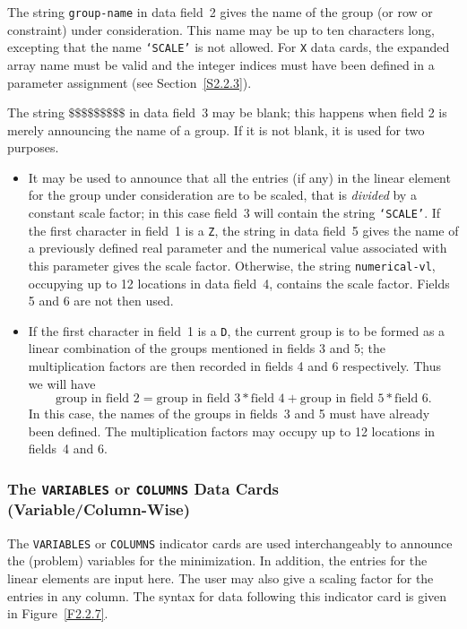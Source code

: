 \documentclass[a4paper]{article}
\begin{document}
The string {\tt  group-name}
in data  field~2 gives the  name of  the group (or row or constraint)
under consideration.  This name may be up
to ten characters long, excepting  that the name  {\tt `SCALE'}
is not
allowed.  For  {\tt X} data  cards,
the expanded  array
name must be valid  and the integer  indices must have been defined in
a parameter assignment (see Section~\ref{S2.2.3}).

The string  $\$\$\$\$\$\$\$\$\$$  in  data field~3  may be blank;
this
happens when field 2 is  merely announcing the name of  a group. If it
is not blank, it is used for two purposes.
\begin{itemize}
\item
It may be used to announce that all the entries (if any) in the linear
element
for the group  under  consideration are to be scaled,  that is
{\em divided}  by a constant  scale factor;  in this case field~3 will
contain the string {\tt `SCALE'}.
If the first  character  in field~1 is a {\tt  Z}, the  string in data
field~5 gives the name of a previously defined  real parameter
and the
numerical value associated with this parameter gives the scale factor.
Otherwise, the string {\tt numerical-vl}, occupying up to 12 locations
in data  field~4, contains the scale factor.   Fields 5 and 6  are not
then used.
\item
If the first character in field~1 is a  {\tt D}, the  current group is
to be formed as a linear combination of the groups mentioned in fields
3 and 5; the multiplication factors are then recorded  in fields 4 and
6 respectively. Thus we will have
\[
\mbox{group in field~2} = \mbox{group in field~3} * \mbox{field~4} +
                          \mbox{group in field~5} * \mbox{field~6}.
\]
In this  case, the names of the  groups  in  fields~3 and 5  must have
already been defined.  The multiplication factors may occupy  up to 12
locations in fields~4 and 6.
\end{itemize}

\subsubsection[The {\tt VARIABLES} or {\tt COLUMNS} Data Cards
 (Variable/Column-Wise)]{\label{S2.2.7}The {\tt VARIABLES} or {\tt COLUMNS} Data
 Cards  \protect\\
(Variable/Column-Wise)}

The  {\tt VARIABLES}  or   {\tt COLUMNS}  indicator   cards
are used interchangeably to announce the (problem) variables
for  the  minimization.  In  addition,   the  entries  for  the linear
elements
are input here.  The user may also give  a scaling factor for
the entries  in  any column.
The syntax  for data  following    this indicator card
is given   in Figure~\ref{F2.2.7}.
\end{document}
